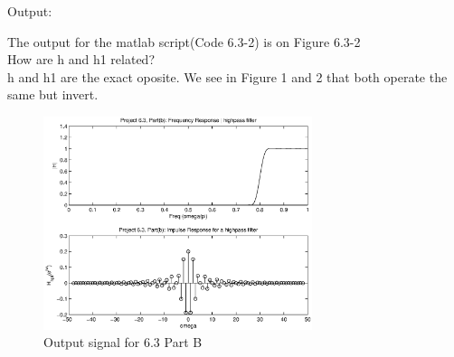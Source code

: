 {\LARGE Output:}\newline

The output for the matlab script(Code 6.3-2) is on Figure 6.3-2 \\

 How are h and h1 related? \\
 h and h1 are the exact oposite. We see in Figure 1 and 2 that both operate the same but invert.\\

\begin{figure}[h!]
  \centering
    \includegraphics[width=0.7\textwidth]{Part2/Output/Figures/proj63PartB.eps}
  \caption{Output signal for 6.3 Part B}
\end{figure}
\pagebreak
